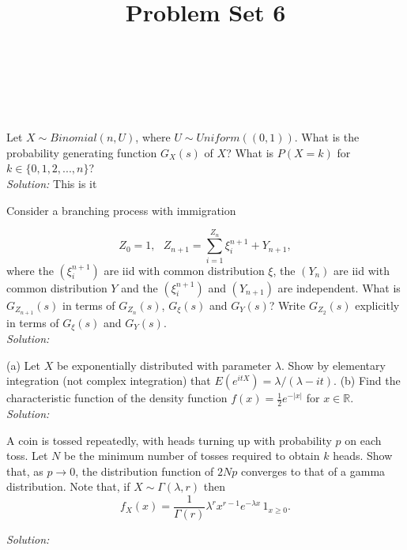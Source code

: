\documentclass[10pt]{amsart}
\begin{document}
\noindent
{} \\
 \\
 \\
\title{Problem Set 6}
\maketitle

 Let $X\sim Binomial(n,U)$, where $U\sim Uniform((0,1))$. What is the probability generating function $G_X(s)$ of $X$? What is $P(X=k)$ for $k\in \{0,1,2,...,n\}$? \\

\noindent
\textit{Solution:}
This is it

\newpage

 Consider a branching process with immigration

$$Z_0 = 1, \,\,\,\,Z_{n+1} = \sum_{i=1}^{Z_n}  \xi^{n+1}_i + Y_{n+1},$$
where the $(\xi^{n+1}_i)$ are iid with common distribution $\xi$, the $(Y_n)$ are iid with common distribution $Y$ and
the $(\xi^{n+1}_i)$ and $(Y_{n+1})$ are independent. What is $G_{Z_{n+1}}(s)$ in terms of $G_{Z_n}(s)$, $G_{\xi}(s)$ and $G_Y(s)$? Write $G_{Z_2}(s)$ explicitly in terms of $G_\xi(s)$ and $G_Y(s)$.
\\

\noindent
\textit{Solution:}

\newpage

 (a) Let $X$ be exponentially distributed with parameter $\lambda$. Show by elementary integration (not complex integration) that $E(e^{itX})=\lambda/(\lambda-i t)$.
(b) Find the characteristic function of the density function $f(x)=\frac{1}{2}e^{-|x|}$ for $x\in \mathds{R}$.
\\

\noindent
\textit{Solution:}

\newpage

 A coin is tossed repeatedly, with heads turning up with probability $p$ on each toss. Let $N$ be the minimum number of tosses required to obtain $k$ heads. Show that, as $p \to 0$, the distribution function of $2Np$ converges to that of a gamma distribution. Note that, if $X \sim \Gamma(\lambda, r )$ then
$$f_X(x) = \frac{1}{\Gamma(r)} \lambda^r x^{r-1} e^{-\lambda x} \, 1_{x \geq 0}.$$

\noindent
\textit{Solution:}
\end{document}

